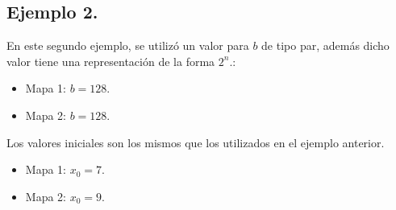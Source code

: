 \documentclass[10pt]{IEEEtran}
\begin{document}
\subsection{Ejemplo 2.}
En este segundo ejemplo, se utilizó un valor para $b$ de tipo par, además dicho valor tiene una representación de la forma $2^{n}$.:

\begin{itemize}
\item Mapa 1: $b =  128$.
\item Mapa 2: $b =  128$.
\end{itemize}

Los valores iniciales son los mismos que los utilizados en el ejemplo anterior.
\begin{itemize}
\item Mapa 1: $x_{0} = 7$.
\item Mapa 2: $x_{0} = 9$.
\end{itemize}
\end{document}
